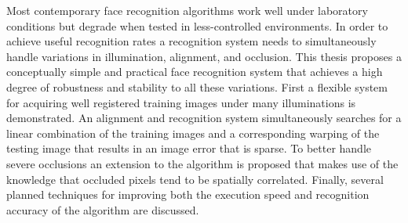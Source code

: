 Most contemporary face recognition algorithms work well under laboratory
conditions but degrade when tested in less-controlled environments. In order to
achieve useful recognition rates a recognition system needs to simultaneously
handle variations in illumination, alignment, and occlusion. This thesis
proposes a conceptually simple and practical face recognition system that
achieves a high degree of robustness and stability to all these variations.
First a flexible system for acquiring well registered training images under
many illuminations is demonstrated.  An alignment and recognition system
simultaneously searches for a linear combination of the training images and a
corresponding warping of the testing image that results in an image error that
is sparse.  To better handle severe occlusions an extension to the algorithm is
proposed that makes use of the knowledge that occluded pixels tend to be
spatially correlated.  Finally, several planned techniques for improving both
the execution speed and recognition accuracy of the algorithm are discussed.

